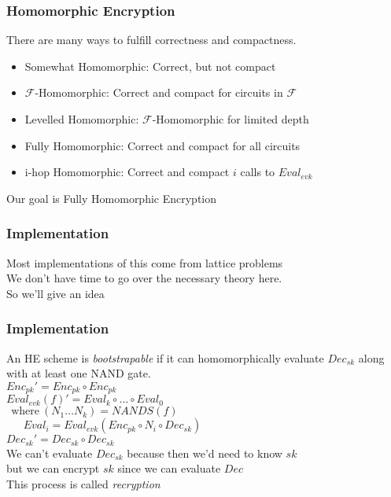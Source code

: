 \begin{frame}
\frametitle{Homomorphic Encryption}

There are many ways to fulfill correctness and compactness.
\begin{itemize}
\pause
  \item Somewhat Homomorphic: Correct, but not compact
\pause
  \item $\mathcal{F}$-Homomorphic: Correct and compact for circuits in $\mathcal{F}$
\pause
  \item Levelled Homomorphic: $\mathcal{F}$-Homomorphic for limited depth
\pause
  \item Fully Homomorphic: Correct and compact for all circuits
\pause
  \item i-hop Homomorphic: Correct and compact $i$ calls to $Eval_{evk}$
\end{itemize}
$\ $\\
\pause
Our goal is Fully Homomorphic Encryption
\end{frame}

\begin{frame}
\frametitle{Implementation}
Most implementations of this come from lattice problems\\
$\ $\\
We don't have time to go over the necessary theory here.\\
$\ $\\
So we'll give an idea\\
\end{frame}

\begin{frame}
\frametitle{Implementation}
An HE scheme is \textit{bootstrapable} if it can homomorphically evaluate
$Dec_{sk}$ along with at least one NAND gate.\\
$\ $\\
\pause
$Enc_{pk}' = Enc_{pk} \circ Enc_{pk}$\\
$\ $\\
\pause
$Eval_{evk}(f)' = Eval_k \circ \ldots \circ Eval_0$\\
$\ \ \text{where}\ (N_1\ldots N_k) = NANDS(f)$\\
$\ \ \ \ \ \ \ Eval_i = Eval_{evk}(Enc_{pk}\circ N_i\circ Dec_{sk})$\\
$\ $\\
\pause
$Dec_{sk}' = Dec_{sk} \circ Dec_{sk}$\\
$\ $\\
\pause
We can't evaluate $Dec_{sk}$ because then we'd need to know $sk$\\
\pause
but we can encrypt $sk$ since we can evaluate $Dec$\\
\pause
This process is called \textit{recryption}\\
\end{frame}
